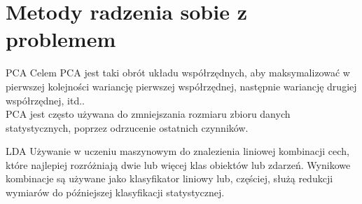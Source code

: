 \documentclass[a4paper]{beamer}
\begin{document}
\section{Metody radzenia sobie z problemem}
\begin{frame}
\begin{block}{PCA}
Celem PCA jest taki obrót układu współrzędnych, aby maksymalizować w pierwszej kolejności wariancję pierwszej współrzędnej, następnie wariancję drugiej współrzędnej, itd.. \\[0.3cm]
PCA jest często używana do zmniejszania rozmiaru zbioru danych statystycznych, poprzez odrzucenie ostatnich czynników.
\end{block}
\pause
\begin{block}{LDA}
Używanie w uczeniu maszynowym do znalezienia liniowej kombinacji cech, które najlepiej rozróżniają dwie lub więcej klas obiektów lub zdarzeń. Wynikowe kombinacje są używane jako klasyfikator liniowy lub, częściej, służą redukcji wymiarów do późniejszej klasyfikacji statystycznej.
\end{block}
\end{frame}
\end{document}
